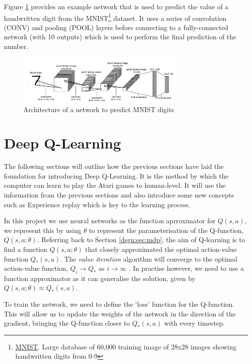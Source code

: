 Figure \ref{fig:mnist-arch} provides an example network that is used to predict the value of a handwritten digit from the MNIST\footnote{\href{http://yann.lecun.com/exdb/mnist/}{MNIST}. Large database of 60,000 training image of 28x28 images showing handwritten digits from 0-9} dataset. It uses a series of convolution (CONV) and pooling (POOL) layers before connecting to a fully-connected network (with 10 outputs) which is used to perform the final prediction of the number.

\begin{figure}[htbp]
	\centering
	\includegraphics[width=0.75\textwidth]{chapters/chapter3/images/mnist.png}
	\caption{Architecture of a network to predict MNIST digits
		\label{fig:mnist-arch}
	}
\end{figure}

\section{Deep Q-Learning}
\label{dsgn:sec:dql}
The following sections will outline how the previous sections have laid the foundation for introducing Deep Q-Learning. It is the method by which the computer can learn to play the Atari games to human-level. It will use the information from the previous sections and also introduce some new concepts such as Experience replay which is key to the learning process.

In this project we use neural networks as the function aprroximator for $Q(s, a)$, we represent this by using $\theta$ to represent the parameterisation of the Q-function, $Q(s, a; \theta)$. Referring back to Section \ref{dsgn:sec:mdp}, the aim of Q-learning is to find a function $Q(s, a; \theta)$ that closely approximated the optimal action-value function $Q_*(s, a)$.
The \textit{value iteration} algorithm will converge to the optimal action-value function, $Q_i \rightarrow Q_*$ as $i \rightarrow \infty$ \cite{richardsutton2018}. In practise however, we need to use a function approximator as it can generalise the solution, given by $Q(s, a; \theta) \approx Q_*(s, a)$.

To train the network, we need to define the `loss' function for the Q-function. This will allow us to update the weights of the network in the direction of the gradient, bringing the Q-function closer to $Q_*(s, a)$ with every timestep.

